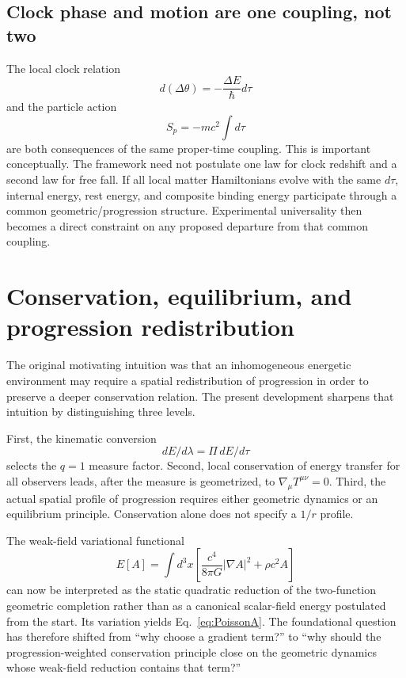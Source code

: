 \documentclass[11pt]{article}
\begin{document}
\subsection{Clock phase and motion are one coupling, not two}

The local clock relation
\begin{equation}
    d(\Delta\theta)=-\frac{\Delta E}{\hbar}d\tau
\end{equation}
and the particle action
\begin{equation}
    S_p=-mc^2\int d\tau
\end{equation}
are both consequences of the same proper-time coupling. This is important conceptually. The framework need not postulate one law for clock redshift and a second law for free fall. If all local matter Hamiltonians evolve with the same $d\tau$, internal energy, rest energy, and composite binding energy participate through a common geometric/progression structure. Experimental universality then becomes a direct constraint on any proposed departure from that common coupling.

\section{Conservation, equilibrium, and progression redistribution}

The original motivating intuition was that an inhomogeneous energetic environment may require a spatial redistribution of progression in order to preserve a deeper conservation relation. The present development sharpens that intuition by distinguishing three levels.

First, the kinematic conversion
\begin{equation}
    dE/d\lambda=\Pi\,dE/d\tau
\end{equation}
selects the $q=1$ measure factor. Second, local conservation of energy transfer for all observers leads, after the measure is geometrized, to $\nabla_\mu T^{\mu\nu}=0$. Third, the actual spatial profile of progression requires either geometric dynamics or an equilibrium principle. Conservation alone does not specify a $1/r$ profile.

The weak-field variational functional
\begin{equation}
    E[A]
    =\int d^3x\left[
    \frac{c^4}{8\pi G}|\nabla A|^2
    +\rho c^2 A\right]
    \label{eq:weak_functional}
\end{equation}
can now be interpreted as the static quadratic reduction of the two-function geometric completion rather than as a canonical scalar-field energy postulated from the start. Its variation yields Eq.~\eqref{eq:PoissonA}. The foundational question has therefore shifted from ``why choose a gradient term?'' to ``why should the progression-weighted conservation principle close on the geometric dynamics whose weak-field reduction contains that term?''
\end{document}
